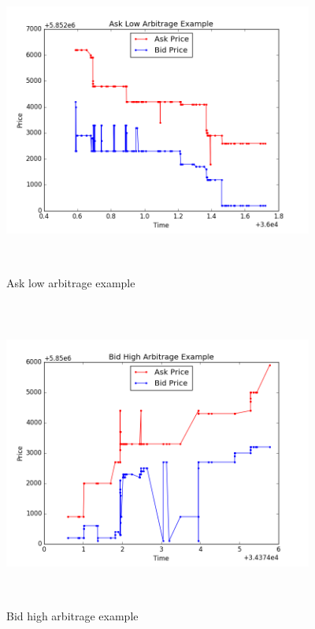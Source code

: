 \begin{figure}[hbtp]
  \begin{center}
    \includegraphics[width=4in,height=4in]{figures/ask_low_example.png}
  \end{center}
\caption{Ask low arbitrage example} \label{fig:ask_low}
\end{figure}


\begin{figure}[hbtp]
  \begin{center}
    \includegraphics[width=4in,height=4in]{figures/bid_high_example.png}
  \end{center}
\caption{Bid high arbitrage example} \label{fig:bid_high}
\end{figure}


